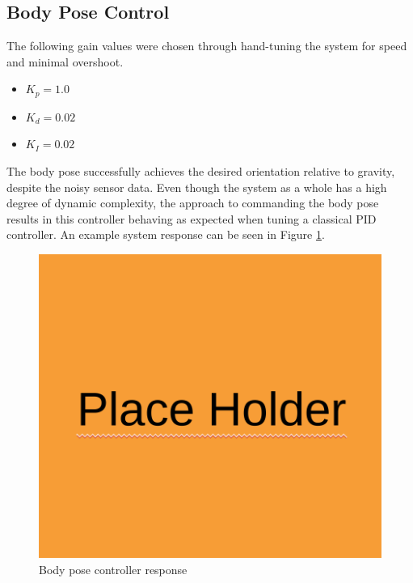 \subsection{ Body Pose Control }
The following gain values were chosen through hand-tuning the system for speed and minimal overshoot. 

\begin{itemize}
    \item $K_p = 1.0$
    \item $K_d = 0.02$
    \item $K_I = 0.02$
\end{itemize}

The body pose successfully achieves the desired orientation relative to gravity, despite the noisy sensor data. Even though the system as a whole has a high degree of dynamic complexity, the approach to commanding the body pose results in this controller behaving as expected when tuning a classical PID controller. An example system response can be seen in Figure \ref{fig:pose_control_response}. 

\begin{figure}[H]
    \centerline{\includegraphics[scale=0.3]{place_holder.png}}
    \caption{ Body pose controller response}
    \label{fig:pose_control_response}
\end{figure}
